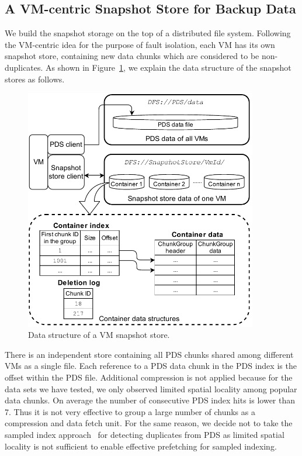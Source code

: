\subsection{A VM-centric Snapshot Store for Backup Data}
\label{data:store}
We build the snapshot storage on the top of a distributed file system.
Following the VM-centric idea for the purpose of fault isolation,
each VM has its own snapshot store, containing new data chunks which are considered
to be non-duplicates.
As shown in Figure~\ref{fig:as_arch}, we explain the data structure of the snapshot stores as follows.
\begin{figure}[htbp]
  \centering
  \includegraphics[width=4in]{images/sstore_arch}
  \caption{Data structure of a VM snapshot store.}
  \label{fig:as_arch}
\end{figure}

There is an independent store containing all PDS chunks shared among different VMs as
a single file.
Each reference to a PDS data chunk in the PDS index is the offset within the PDS file.
Additional compression is not applied because 
for the data sets we have tested, we only observed limited spatial locality 
among popular data chunks. On average the number of consecutive PDS index hits is lower than 7.
Thus it is not very effective to group a large number of chunks as a compression and data fetch unit. 
For the same reason, we decide not to take the sampled index approach~\cite{Guo2011} 
for detecting duplicates from PDS as limited spatial locality is not sufficient to enable
effective prefetching for sampled indexing.

